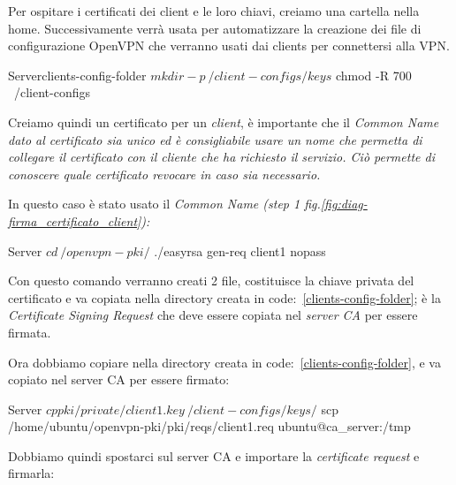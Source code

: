
Per ospitare i certificati dei client e le loro chiavi, creiamo una cartella nella home. Successivamente verrà usata per automatizzare la creazione dei file di configurazione OpenVPN che verranno usati dai clients per connettersi alla VPN.

\begin{bashcode}{Server}{clients-config-folder}
$ mkdir -p ~/client-configs/keys
$ chmod -R 700 ~/client-configs
\end{bashcode}

Creiamo quindi un certificato per un \textit{client}, è importante che il \it{Common Name} dato al certificato sia unico ed è consigliabile usare un nome che permetta di collegare il certificato con il cliente che ha richiesto il servizio. Ciò permette di conoscere quale certificato revocare in caso sia necessario.

In questo caso è stato usato il \it{Common Name}  (step 1 fig.\ref{fig:diag-firma_certificato_client}):

\begin{bashcode}{Server}{}
$ cd ~/openvpn-pki/
$ ./easyrsa gen-req client1 nopass
\end{bashcode}

Con questo comando verranno creati 2 file,  costituisce la chiave privata del certificato e va copiata nella directory creata in code:~\ref{clients-config-folder};  è la \textit{Certificate Signing Request} che deve essere copiata nel \textit{server CA} per essere firmata.

Ora dobbiamo copiare  nella directory creata in code:~\ref{clients-config-folder}, e  va copiato nel server CA per essere firmato:

\begin{bashcode}{Server}{}
$ cp pki/private/client1.key ~/client-configs/keys/
$ scp /home/ubuntu/openvpn-pki/pki/reqs/client1.req ubuntu@ca_server:/tmp
\end{bashcode}

Dobbiamo quindi spostarci sul server CA e importare la \textit{certificate request} e firmarla:


